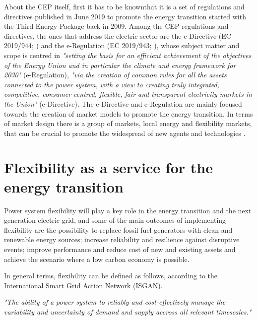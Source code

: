 About the CEP itself, first it has to be knownthat it is a set of regulations and directives published in June 2019 to promote the energy transition started with the Third Energy Package back in 2009. Among the CEP regulations and directives, the ones that address the electric sector are the e-Directive (EC 2019/944; \cite{Directive2019944}) and the e-Regulation (EC 2019/943; \cite{Directive2019943}), whose subject matter and scope is centred in \textit{"setting the basis for an efficient achievement of the objectives of the Energy Union and in particular the climate and energy framework for 2030"} (e-Regulation), \textit{"via the creation of common rules for all the assets connected to the power system, with a view to creating truly integrated, competitive, consumer-centred, flexible, fair and transparent electricity markets in the Union"} (e-Directive). The e-Directive and e-Regulation are mainly focused towards the creation of market models to
promote the energy transition. In terms of market design there is a group of markets, local energy and flexibility markets, that can be crucial to promote the widespread of new agents and technologies \cite{Xu2019}.


\section{Flexibility as a service for the energy transition}
Power system flexibility will play a key role in the energy transition and the next generation electric grid, and some of the main outcomes of implementing flexibility are the possibility to replace fossil fuel generators with clean and renewable energy sources; increase reliability and resilience against disruptive events; improve performance and reduce cost of new and existing assets and achieve the scenario where a low carbon economy is possible. 

In general terms, flexibility can be defined as follows, according to the International Smart Grid Action Network (ISGAN)\cite{Hillberg2019}.

\begin{tcolorbox}
\textit{"The ability of a power system to reliably and cost-effectively manage the variability and uncertainty of demand and supply accross all relevant timescales."}
\end{tcolorbox} 

